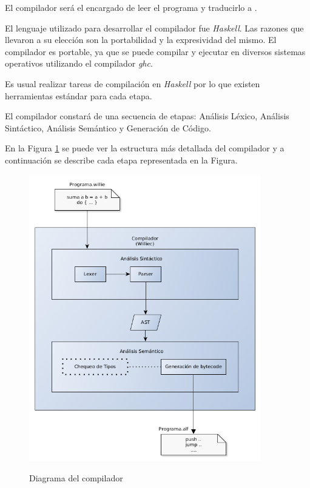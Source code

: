 

  El compilador será el encargado de leer el programa \frob{} y traducirlo
a \alf{}.

  El lenguaje utilizado para desarrollar el compilador fue \textit{Haskell}.
  Las razones que llevaron a su elección son la portabilidad y la
expresividad del mismo.
  El compilador \compilador{} es portable, ya que se puede compilar y ejecutar
en diversos sistemas operativos utilizando el compilador \textit{ghc}.

  Es usual realizar tareas de compilación en \textit{Haskell} por lo que existen
herramientas estándar para cada etapa.

  El compilador constará de una secuencia de etapas: Análisis Léxico,
  Análisis Sintáctico, Análisis Semántico y Generación de Código.

  En la Figura \ref{fig:compiler} se puede ver la estructura más detallada
del compilador y a continuación se describe cada etapa representada en la Figura.

\begin{figure}[h!]
\begin{center}
\caption{Diagrama del compilador}
\includegraphics[width=0.9\textwidth]{graphs/compiler.png}
\label{fig:compiler}
\end{center}
\end{figure}



